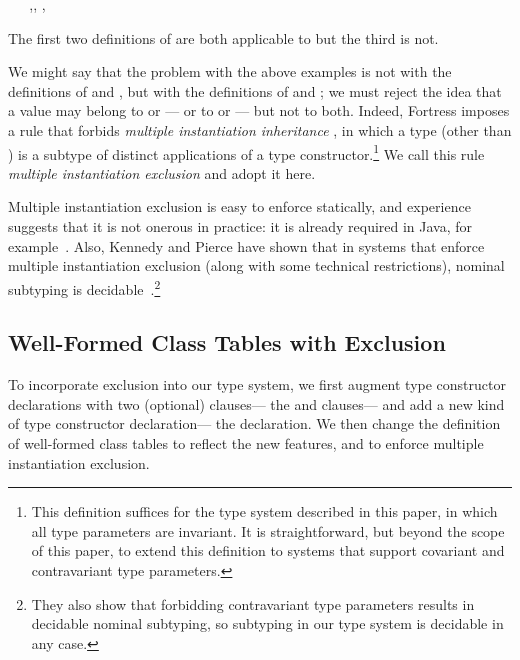 \documentclass[10pt]{sigplanconf}
\newcommand{\Bottom}{\TYP{Bottom}}
\begin{document}
\small
\begin{FortressCode}
{\tt ~~}\+ \SHORTCUT{<} \bigl\lbrace\,\llbracket{},\rrbracket, \llbracket{},\rrbracket\,\bigr\rbrace\-
\end{FortressCode}
\normalsize
The first two definitions of  are both applicable to  
but the third is not.

We might say that the problem with the above examples 
is not with the definitions of  and , 
but with the definitions of  and ;
we must reject the idea
that a value may belong to  or ---%
or to  or ---%
but not to both.
Indeed, Fortress imposes a rule that forbids 
\emph{multiple instantiation inheritance} \cite{kennedy07}, 
in which a type (other than \Bottom) 
is a subtype of distinct applications of a type constructor.\!\footnote{%
This definition suffices for the type system described in this paper, 
in which all type parameters are invariant.
It is straightforward, 
but beyond the scope of this paper, 
to extend this definition to systems 
that support covariant and contravariant type parameters.}
We call this rule \emph{multiple instantiation exclusion}
and adopt it here.

Multiple instantiation exclusion is easy to enforce statically, 
and experience suggests that it is not onerous in practice: 
it is already required in Java, for example~\cite{JavaSpec}.
Also, 
Kennedy and Pierce have shown that 
in systems that enforce multiple instantiation exclusion 
(along with some technical restrictions),
nominal subtyping is decidable~\cite{kennedy07}.\!\footnote{%
They also show that forbidding contravariant type parameters 
results in decidable nominal subtyping, 
so subtyping in our type system is decidable in any case.}


\subsection{Well-Formed Class Tables with Exclusion}
\label{sec:exc-spec}

To incorporate exclusion into our type system, 
we first augment type constructor declarations 
with two (optional) clauses---%
the  and  clauses---%
and add a new kind of type constructor declaration---%
the  declaration.
We then change the definition of well-formed class tables 
to reflect the new features, 
and to enforce multiple instantiation exclusion.
\end{document}
